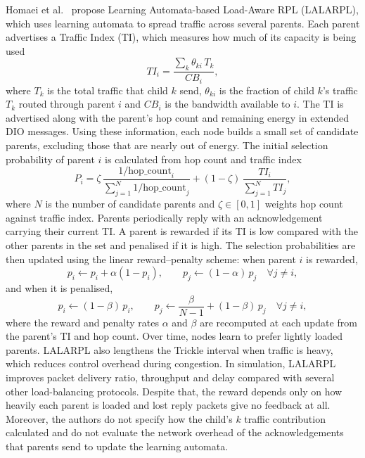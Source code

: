 Homaei et al.~\cite{homaeiLoadBalancingIoT2025} propose Learning
Automata-based Load-Aware RPL (LALARPL), which uses learning automata
to spread traffic across several parents. Each parent advertises a
Traffic Index (TI), which measures how much of its capacity is being
used
\begin{equation}
    TI_i = \frac{\sum_{k} \theta_{ki} \, T_k}{CB_i},
\end{equation}
where $T_k$ is the total traffic that child $k$ send, $\theta_{ki}$
is the fraction of child $k$'s traffic $T_k$
routed through parent $i$ and $CB_i$ is the bandwidth available to
$i$. The TI is advertised along with the parent's hop count and
remaining energy in extended DIO messages. Using these information,
each node builds a small set of candidate parents, excluding those
that are nearly out of energy. The initial
selection probability of parent $i$ is calculated from hop count and
traffic index
\begin{equation}
    P_i = \zeta \, \frac{1/\mathrm{hop\_count}_i}{\sum_{j=1}^{N}
    1/\mathrm{hop\_count}_j} + (1-\zeta)\, \frac{TI_i}{\sum_{j=1}^{N} TI_j},
\end{equation}
where $N$ is the number of candidate parents and
$\zeta \in [0,1]$ weights hop count against traffic index.
Parents periodically reply with an acknowledgement carrying their
current TI. A parent is rewarded if its TI is low compared with the
other parents in the set and penalised if it is high. The selection
probabilities are then updated using the linear reward--penalty
scheme: when parent $i$ is rewarded,
\begin{equation}
    p_i \leftarrow p_i + \alpha (1 - p_i), \qquad
    p_j \leftarrow (1 - \alpha)\, p_j \quad \forall j \neq i,
\end{equation}
and when it is penalised,
\begin{equation}
    p_i \leftarrow (1 - \beta)\, p_i, \qquad
    p_j \leftarrow \frac{\beta}{N-1} + (1 - \beta)\, p_j
    \quad \forall j \neq i,
\end{equation}
where the reward and penalty rates $\alpha$ and $\beta$ are
recomputed at each update from the parent's TI and hop count.
Over time, nodes learn to prefer lightly loaded parents.
LALARPL also lengthens the Trickle interval when traffic is heavy,
which reduces control overhead during congestion. In simulation,
LALARPL improves packet delivery ratio, throughput and delay compared
with several other load-balancing protocols. Despite that, the reward
depends only on how heavily each parent is
loaded and lost reply packets give no feedback at all. Moreover, the
authors do not specify how the child's $k$ traffic
contribution calculated and do not evaluate the network overhead of
the acknowledgements that parents send to update the learning
automata.

